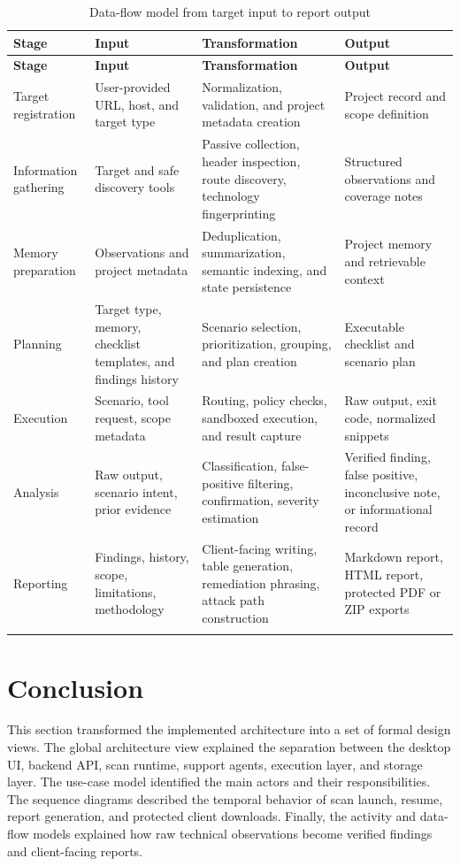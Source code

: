 \documentclass[12pt,a4paper]{report}
\begin{document}
\begin{longtable}{|p{}|p{}|p{}|p{}|}
\hline
\textbf{Stage} & \textbf{Input} & \textbf{Transformation} & \textbf{Output} \\
\hline
\endfirsthead
\hline
\textbf{Stage} & \textbf{Input} & \textbf{Transformation} & \textbf{Output} \\
\hline
\endhead
Target registration & User-provided URL, host, and target type & Normalization,
validation, and project metadata creation & Project record and scope definition \\
\hline
Information gathering & Target and safe discovery tools & Passive collection, header
inspection, route discovery, technology fingerprinting & Structured observations and
coverage notes \\
\hline
Memory preparation & Observations and project metadata & Deduplication, summarization,
semantic indexing, and state persistence & Project memory and retrievable context \\
\hline
Planning & Target type, memory, checklist templates, and findings history & Scenario
selection, prioritization, grouping, and plan creation & Executable checklist and
scenario plan \\
\hline
Execution & Scenario, tool request, scope metadata & Routing, policy checks, sandboxed
execution, and result capture & Raw output, exit code, normalized snippets \\
\hline
Analysis & Raw output, scenario intent, prior evidence & Classification, false-positive
filtering, confirmation, severity estimation & Verified finding, false positive,
inconclusive note, or informational record \\
\hline
Reporting & Findings, history, scope, limitations, methodology & Client-facing writing,
table generation, remediation phrasing, attack path construction & Markdown report,
HTML report, protected PDF or ZIP exports \\
\hline
\caption{Data-flow model from target input to report output}
\label{tab:data_flow}
\end{longtable}

\section*{Conclusion}

This section transformed the implemented architecture into a set of formal design
views. The global architecture view explained the separation between the desktop UI,
backend API, scan runtime, support agents, execution layer, and storage layer. The
use-case model identified the main actors and their responsibilities. The sequence
diagrams described the temporal behavior of scan launch, resume, report generation,
and protected client downloads. Finally, the activity and data-flow models explained
how raw technical observations become verified findings and client-facing reports.
\end{document}
